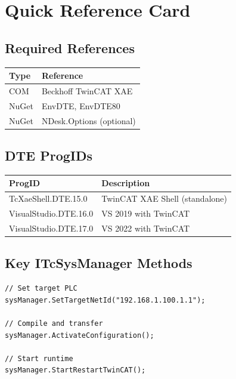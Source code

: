 \documentclass[11pt,a4paper]{article}
\begin{document}
\section*{Quick Reference Card}

\subsection*{Required References}

\begin{table}[h]
\centering
\begin{tabular}{@{}ll@{}}
\toprule
\textbf{Type} & \textbf{Reference} \\
\midrule
COM & Beckhoff TwinCAT XAE \\
NuGet & EnvDTE, EnvDTE80 \\
NuGet & NDesk.Options (optional) \\
\bottomrule
\end{tabular}
\end{table}

\subsection*{DTE ProgIDs}

\begin{table}[h]
\centering
\begin{tabular}{@{}ll@{}}
\toprule
\textbf{ProgID} & \textbf{Description} \\
\midrule
TcXaeShell.DTE.15.0 & TwinCAT XAE Shell (standalone) \\
VisualStudio.DTE.16.0 & VS 2019 with TwinCAT \\
VisualStudio.DTE.17.0 & VS 2022 with TwinCAT \\
\bottomrule
\end{tabular}
\end{table}

\subsection*{Key ITcSysManager Methods}

\begin{lstlisting}[style=csharpstyle]
// Set target PLC
sysManager.SetTargetNetId("192.168.1.100.1.1");

// Compile and transfer
sysManager.ActivateConfiguration();

// Start runtime
sysManager.StartRestartTwinCAT();
\end{lstlisting}
\end{document}
